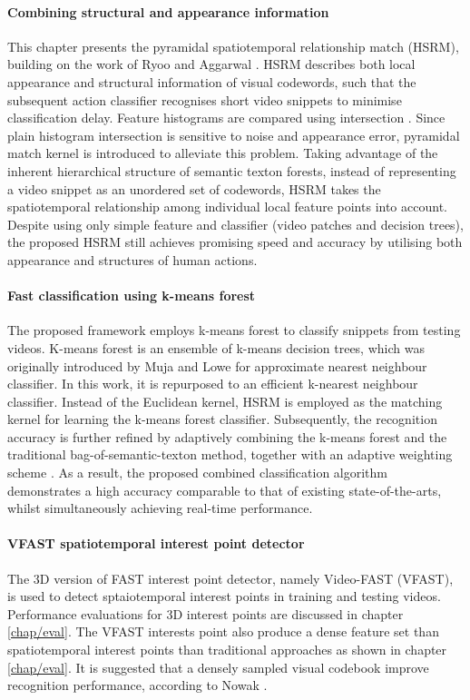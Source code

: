 \paragraph{Combining structural and appearance information}
This chapter presents the pyramidal spatiotemporal relationship match (HSRM), building on the work of Ryoo and Aggarwal \cite{Ryoo2009}.  
HSRM describes both local appearance and structural information of visual codewords, such that the subsequent action classifier recognises short video snippets to minimise classification delay. 
Feature histograms are compared using intersection \cite{Ryoo2009}. 
Since plain histogram intersection is sensitive to noise and appearance error, pyramidal match kernel \cite{Grauman2005} is introduced to alleviate this problem. 
Taking advantage of the inherent hierarchical structure of semantic texton forests, instead of representing a video snippet as an unordered set of codewords, HSRM takes the spatiotemporal relationship among individual local feature points into account. 
Despite using only simple feature and classifier (video patches and decision trees), the proposed HSRM still achieves promising speed and accuracy by utilising both appearance and structures of human actions. 


\paragraph{Fast classification using k-means forest} 
The proposed framework employs k-means forest to classify snippets from testing videos. 
K-means forest is an ensemble of k-means decision trees, which was originally introduced by Muja and Lowe \cite{Muja2009} for approximate nearest neighbour classifier. In this work, it is repurposed to an efficient k-nearest neighbour classifier. Instead of the Euclidean kernel, HSRM is employed as the matching kernel for learning the k-means forest classifier.  
Subsequently, the recognition accuracy is further refined by adaptively combining the k-means forest and the traditional bag-of-semantic-texton method, together with an adaptive weighting scheme \cite{Shotton2008}. 
As a result, the proposed combined classification algorithm demonstrates a high accuracy comparable to that of existing state-of-the-arts, whilst simultaneously achieving real-time performance. 


\paragraph{VFAST spatiotemporal interest point detector} 
The 3D version of FAST interest point detector, namely Video-FAST (VFAST), is used to detect sptaiotemporal interest points in training and testing videos.   
Performance evaluations for 3D interest points are discussed in chapter \ref{chap/eval}.  
The VFAST interests point also produce a dense feature set than spatiotemporal interest points than traditional approaches as shown in chapter \ref{chap/eval}. It is suggested that a densely sampled visual codebook improve recognition performance, according to Nowak \etal \cite{Nowak2006}.

